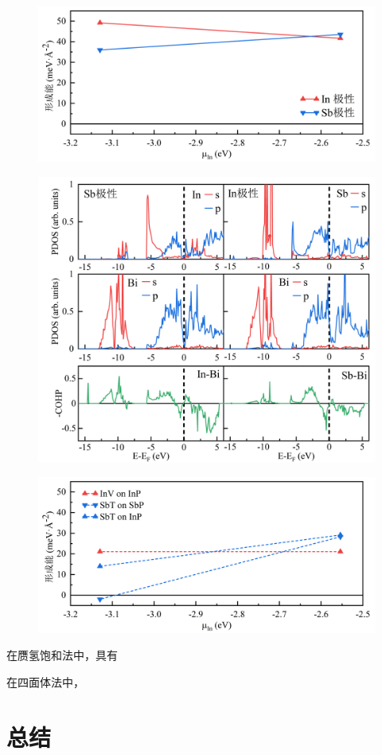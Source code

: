 \begin{figure}
    \includegraphics{pic/IS_DFT_surfaceE_InPSbP.png}
\end{figure}

\begin{figure}
    \includegraphics{pic/IS_DFT_PDOS-COHP.png}
\end{figure}

\begin{figure}
    \includegraphics{pic/IS_DFT_surfaceE_InVSbT.png}
\end{figure}
在赝氢饱和法中，具有 %

在四面体法中，%
\section{总结}